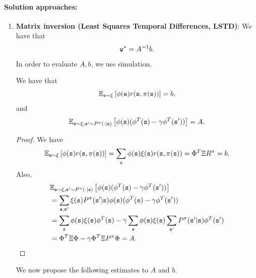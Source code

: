 \paragraph{Solution approaches:}
\begin{enumerate}
\item \textbf{Matrix inversion (Least Squares Temporal Differences, LSTD)}: 
We have that $${\tt w}^* = A^{-1}b.$$
In order to evaluate $A,b$, we use simulation.
\begin{proposition}\label{prop:TD_expectations}
    We have that 
    \begin{equation*}
        \mathbb{E}_{{\tt s}\sim\xi}\left[ {\phi}({\tt s}) r({\tt s},\pi({\tt s})) \right] = b,
    \end{equation*}
    and
    \begin{equation*}
        \mathbb{E}_{{\tt s}\sim\xi, {\tt s}'\sim P^\pi(\cdot|{\tt s})}\left[ {\phi}({\tt s})( {\phi}^T({\tt s})-\gamma {\phi}^T({\tt s}')) \right] = A.
    \end{equation*}
\end{proposition}
\begin{proof}
    We have
    \begin{equation*}
        \mathbb{E}_{{\tt s}\sim\xi}\left[ {\phi}({\tt s}) r({\tt s},\pi({\tt s})) \right] = \sum_{{\tt s}}  {\phi}({\tt s}) \xi({\tt s}) r({\tt s},\pi({\tt s})) = \Phi^T\Xi R^\pi = b.
    \end{equation*}
    Also,
    \begin{equation*}
    \begin{split}
        &\mathbb{E}_{{\tt s}\sim\xi, {\tt s}'\sim P^\pi(\cdot|{\tt s})}\left[ {\phi}({\tt s})( {\phi}^T({\tt s})-\gamma {\phi}^T({\tt s}')) \right] \\
        &= \sum_{{\tt s},{\tt s}'} \xi({\tt s})P^\pi({\tt s}'|{\tt s}){\phi}({\tt s})( {\phi}^T({\tt s})-\gamma {\phi}^T({\tt s}')) \\
        &= \sum_{{\tt s}} {\phi}({\tt s}) \xi({\tt s}){\phi}^T({\tt s}) - \gamma\sum_{{\tt s}}{\phi}({\tt s})\xi({\tt s})\sum_{{\tt s}'}P^\pi({\tt s}'|{\tt s}){\phi}^T({\tt s}')\\
        &= \Phi^T \Xi \Phi -\gamma \Phi^T\Xi P^\pi \Phi = A.
    \end{split}
    \end{equation*}
\end{proof}
We now propose the following estimates to $A$ and $b$. 


\end{enumerate}
